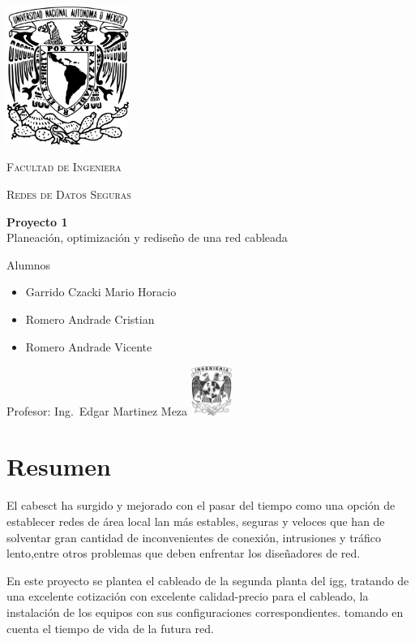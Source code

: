 \documentclass[letterpaper]{article}
\begin{document}
\begin{titlepage}
  \centering
  \includegraphics[width=0.3\textwidth]{unam_logo}\vfill{}
  {\scshape\Huge Facultad de Ingeniera\par}\vspace{0.5cm}
  {\scshape\Large Redes de Datos Seguras\par}\vfill
  {\huge \textbf{Proyecto 1}\\Planeación, optimización y
    rediseño de una red cableada}\vfill
  
  {\Large
    Alumnos\begin{itemize}
    \item Garrido Czacki Mario Horacio
    \item Romero Andrade Cristian
    \item Romero Andrade Vicente

    \end{itemize}
  }\vfill
  {\large Profesor: Ing.~Edgar Martinez Meza}\vfill
  \includegraphics[width=0.1\textwidth]{inge_logo}
  
  
\end{titlepage}

\tableofcontents{}\newpage

\section{Resumen}\label{sec:resumen}

El \gls{cabesct}  ha  surgido  y  mejorado  con
el  pasar  del  tiempo  como  una opción de establecer
redes de área local \acrshort{lan} más estables, seguras y veloces
que han de solventar gran cantidad  de inconvenientes de
conexión,  intrusiones y tráfico lento,entre otros problemas
que deben enfrentar los diseñadores de red.

En este proyecto se plantea el cableado de la segunda planta
del \acrfull{igg}, tratando de una excelente cotización
con excelente calidad-precio para el cableado, la instalación de
los equipos con sus configuraciones correspondientes.
tomando en cuenta el tiempo de vida
de la futura red. 
\end{document}
